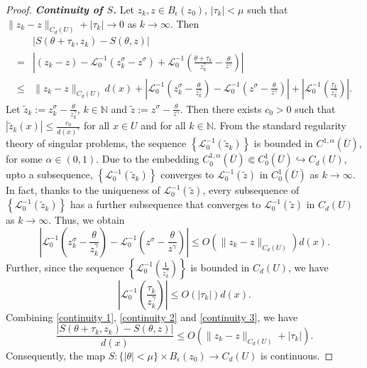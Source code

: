 \documentclass[10pt,a4paper]{amsart}
\newcommand{\ball}{B_{\epsilon} (z_0)}
\newcommand{\li}{\mathcal{L}_0^{-1}}
\newcommand{\rar}{\rightarrow}
\newcommand{\si}{\sigma}
\newcommand{\sn}{\mathbb{N}}
\begin{document}
\begin{proof}
    \textit{\textbf{Continuity of $S$.}} Let $z_k, z \in \ball$, $|\tau_k| < \mu $ such that $\| z_k -z \|_{C_d (U)} + |\tau_k | \rar 0 $ as $k\rar\infty$. Then
    \begin{align}\label{continuity 1}
        &\left|S(\theta + \tau_k, z_k) - S(\theta, z) \right|\nonumber\\
        = &\left|(z_k -z) - \li \left(z_k^{\si} - z^{\si} \right) + \li \left( \frac{\theta+ \tau_k}{z_k^{\gamma}} - \frac{\theta}{z^{\gamma}} \right)\right|\nonumber\\
        \leq &\|z_k -z\|_{C_d (U)} d(x) + \left|\li \left(z_k^{\si} - \frac{\theta}{z_k^{\gamma}} \right) - \li \left(z^{\si} - \frac{\theta}{z^{\gamma}} \right) \right| + \left|\li \left(\frac{\tau_k}{z_k^{\gamma}} \right)\right|.
    \end{align}
    Let $\tilde{z}_k := z_k^{\si} - \frac{\theta}{z_k^{\gamma}}$, $k\in \sn$ and $\tilde{z}:= z^{\si} - \frac{\theta}{z^{\gamma}}$. Then there exists $c_0>0$ such that $\left|\tilde{z}_k (x) \right| \leq \frac{c_0}{d(x)^{\gamma}}$ for all $x\in U$ and for all $k\in\sn$. From the standard regularity theory of singular problems, the sequence $\left\{ \li (\tilde{z}_k)\right\}$ is bounded in $C^{1, \alpha} (\overline{U}) $, for some $\alpha\in (0,1)$. Due to the embedding $C^{1, \alpha}_0 (\overline{U}) \Subset C^1_0 (\overline{U}) \hookrightarrow C_d (U)$, upto a subsequence, $\left\{\li (\tilde{z}_k)\right\}$ converges to $\li (\tilde{z})$ in $C^1_0 (\overline{U})$ as $k\rar\infty$. In fact, thanks to the uniqueness of $\li (\tilde{z})$, every subsequence of $\left\{\li (\tilde{z}_k ) \right\}$ has a further subsequence that converges to $\li (\tilde{z})$ in $C_d (U)$ as $k\rar\infty$. Thus, we obtain
    \begin{equation}\label{continuity 2}
        \left|\li \left(z_k^{\si} - \frac{\theta}{z_k^{\gamma}} \right) - \li \left(z^{\si} - \frac{\theta}{z^{\gamma}} \right) \right| \leq O\left(\|z_k - z\|_{C_d (U)}\right) d(x).
    \end{equation}
    Further, since the sequence $\left\{\li \left(\frac{1}{z_k^{\gamma}} \right)\right\}$ is bounded in $C_d (U)$, we have
    \begin{equation}\label{continuity 3}
        \left|\li \left(\frac{\tau_k}{z_k^{\gamma}} \right)\right| \leq O\left(|\tau_k|\right) d(x).
    \end{equation}
    Combining \eqref{continuity 1}, \eqref{continuity 2} and \eqref{continuity 3}, we have
    \[ \frac{\left|S(\theta + \tau_k, z_k) - S(\theta, z) \right|}{d(x)} \leq O\left(\|z_k - z\|_{C_d (U)} + |\tau_k|\right). \]
    Consequently, the map $S: \{|\theta| < \mu \} \times B_{\epsilon} (z_0) \rar C_d (U)$ is continuous.
    \vspace{5pt}


\end{proof}
\end{document}
